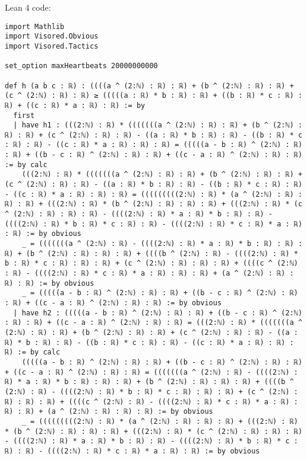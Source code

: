 \documentclass{article}
\begin{document}
Lean 4 code:
\begin{tcolorbox}[colback=white!10, width=\linewidth]
\begin{lstlisting}[language=Lean4]
import Mathlib
import Visored.Obvious
import Visored.Tactics

set_option maxHeartbeats 20000000000

def h (a b c : ℝ) : ((((a ^ (2:ℕ) : ℝ) : ℝ) + (b ^ (2:ℕ) : ℝ) : ℝ) + (c ^ (2:ℕ) : ℝ) : ℝ) ≥ (((((a : ℝ) * b : ℝ) : ℝ) + ((b : ℝ) * c : ℝ) : ℝ) + ((c : ℝ) * a : ℝ) : ℝ) := by
  first
  | have h1 : (((2:ℕ) : ℝ) * (((((((a ^ (2:ℕ) : ℝ) : ℝ) + (b ^ (2:ℕ) : ℝ) : ℝ) + (c ^ (2:ℕ) : ℝ) : ℝ) - ((a : ℝ) * b : ℝ) : ℝ) - ((b : ℝ) * c : ℝ) : ℝ) - ((c : ℝ) * a : ℝ) : ℝ) : ℝ) = (((((a - b : ℝ) ^ (2:ℕ) : ℝ) : ℝ) + ((b - c : ℝ) ^ (2:ℕ) : ℝ) : ℝ) + ((c - a : ℝ) ^ (2:ℕ) : ℝ) : ℝ) := by calc
    (((2:ℕ) : ℝ) * (((((((a ^ (2:ℕ) : ℝ) : ℝ) + (b ^ (2:ℕ) : ℝ) : ℝ) + (c ^ (2:ℕ) : ℝ) : ℝ) - ((a : ℝ) * b : ℝ) : ℝ) - ((b : ℝ) * c : ℝ) : ℝ) - ((c : ℝ) * a : ℝ) : ℝ) : ℝ) = (((((((((2:ℕ) : ℝ) * (a ^ (2:ℕ) : ℝ) : ℝ) : ℝ) + (((2:ℕ) : ℝ) * (b ^ (2:ℕ) : ℝ) : ℝ) : ℝ) + (((2:ℕ) : ℝ) * (c ^ (2:ℕ) : ℝ) : ℝ) : ℝ) - ((((2:ℕ) : ℝ) * a : ℝ) * b : ℝ) : ℝ) - ((((2:ℕ) : ℝ) * b : ℝ) * c : ℝ) : ℝ) - ((((2:ℕ) : ℝ) * c : ℝ) * a : ℝ) : ℝ) := by obvious
    _ = (((((((a ^ (2:ℕ) : ℝ) - ((((2:ℕ) : ℝ) * a : ℝ) * b : ℝ) : ℝ) : ℝ) + (b ^ (2:ℕ) : ℝ) : ℝ) : ℝ) + ((((b ^ (2:ℕ) : ℝ) - ((((2:ℕ) : ℝ) * b : ℝ) * c : ℝ) : ℝ) : ℝ) + (c ^ (2:ℕ) : ℝ) : ℝ) : ℝ) + ((((c ^ (2:ℕ) : ℝ) - ((((2:ℕ) : ℝ) * c : ℝ) * a : ℝ) : ℝ) : ℝ) + (a ^ (2:ℕ) : ℝ) : ℝ) : ℝ) := by obvious
    _ = (((((a - b : ℝ) ^ (2:ℕ) : ℝ) : ℝ) + ((b - c : ℝ) ^ (2:ℕ) : ℝ) : ℝ) + ((c - a : ℝ) ^ (2:ℕ) : ℝ) : ℝ) := by obvious
  | have h2 : (((((a - b : ℝ) ^ (2:ℕ) : ℝ) : ℝ) + ((b - c : ℝ) ^ (2:ℕ) : ℝ) : ℝ) + ((c - a : ℝ) ^ (2:ℕ) : ℝ) : ℝ) = (((2:ℕ) : ℝ) * (((((((a ^ (2:ℕ) : ℝ) : ℝ) + (b ^ (2:ℕ) : ℝ) : ℝ) + (c ^ (2:ℕ) : ℝ) : ℝ) - ((a : ℝ) * b : ℝ) : ℝ) - ((b : ℝ) * c : ℝ) : ℝ) - ((c : ℝ) * a : ℝ) : ℝ) : ℝ) := by calc
    (((((a - b : ℝ) ^ (2:ℕ) : ℝ) : ℝ) + ((b - c : ℝ) ^ (2:ℕ) : ℝ) : ℝ) + ((c - a : ℝ) ^ (2:ℕ) : ℝ) : ℝ) = (((((((a ^ (2:ℕ) : ℝ) - ((((2:ℕ) : ℝ) * a : ℝ) * b : ℝ) : ℝ) : ℝ) + (b ^ (2:ℕ) : ℝ) : ℝ) : ℝ) + ((((b ^ (2:ℕ) : ℝ) - ((((2:ℕ) : ℝ) * b : ℝ) * c : ℝ) : ℝ) : ℝ) + (c ^ (2:ℕ) : ℝ) : ℝ) : ℝ) + ((((c ^ (2:ℕ) : ℝ) - ((((2:ℕ) : ℝ) * c : ℝ) * a : ℝ) : ℝ) : ℝ) + (a ^ (2:ℕ) : ℝ) : ℝ) : ℝ) := by obvious
    _ = (((((((((2:ℕ) : ℝ) * (a ^ (2:ℕ) : ℝ) : ℝ) : ℝ) + (((2:ℕ) : ℝ) * (b ^ (2:ℕ) : ℝ) : ℝ) : ℝ) + (((2:ℕ) : ℝ) * (c ^ (2:ℕ) : ℝ) : ℝ) : ℝ) - ((((2:ℕ) : ℝ) * a : ℝ) * b : ℝ) : ℝ) - ((((2:ℕ) : ℝ) * b : ℝ) * c : ℝ) : ℝ) - ((((2:ℕ) : ℝ) * c : ℝ) * a : ℝ) : ℝ) := by obvious

\end{lstlisting}
\end{tcolorbox}
\end{document}
